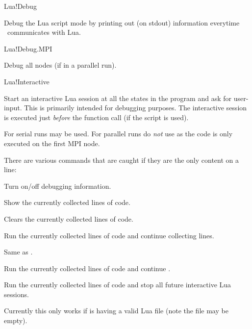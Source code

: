 \begin{fdflogicalF}{Lua!Debug}

  Debug the Lua script mode by printing out (on stdout) information
  everytime \siesta\ communicates with Lua.
  
\end{fdflogicalF}

\begin{fdflogicalF}{Lua!Debug.MPI}

  Debug all nodes (if in a parallel run).
  
\end{fdflogicalF}

\begin{fdflogicalF}{Lua!Interactive}

  Start an interactive Lua session at all the states in the program
  and ask for user-input.
  This is primarily intended for debugging purposes. The interactive
  session is executed just \emph{before} the 
  function call (if the script is used).
  
  For serial runs  may be used. For parallel runs do
  \emph{not} use  as the code is only
  executed on the first MPI node.

  There are various commands that are caught if they are the only
  content on a line:
  \begin{fdfoptions}
    \option[/debug]%
    Turn on/off debugging information.

    \option[/show]%
    Show the currently collected lines of code.

    \option[/clear]%
    Clears the currently collected lines of code.

    \option[;]%
    Run the currently collected lines of code and continue collecting
    lines.

    \option[/run]%
    Same as \code{;}.

    \option[/cont]%
    Run the currently collected lines of code and continue \siesta.

    \option[/stop]%
    Run the currently collected lines of code and stop all future
    interactive Lua sessions.

  \end{fdfoptions}

  Currently this only works if  is having a valid Lua
  file (note the file may be empty).
  
\end{fdflogicalF}



